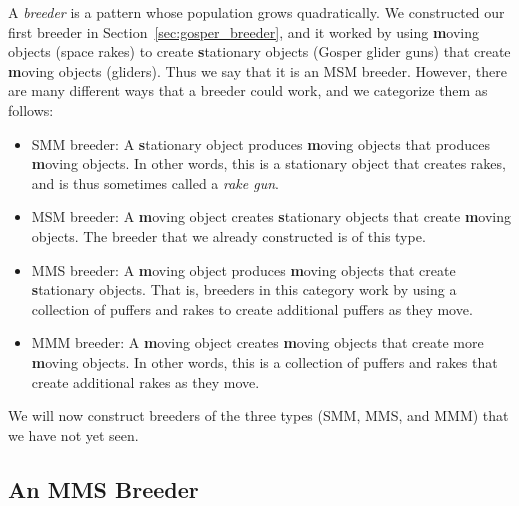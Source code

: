 A \emph{breeder} is a pattern whose population grows quadratically. We constructed our first breeder in Section~\ref{sec:gosper_breeder}, and it worked by using \textbf{m}oving objects (space rakes) to create \textbf{s}tationary objects (Gosper glider guns) that create \textbf{m}oving objects (gliders). Thus we say that it is an MSM breeder. However, there are many different ways that a breeder could work, and we categorize them as follows:
\begin{itemize}
	\item SMM breeder: A \textbf{s}tationary object produces \textbf{m}oving objects that produces \textbf{m}oving objects. In other words, this is a stationary object that creates rakes, and is thus sometimes called a \emph{rake gun}.
	\item MSM breeder: A \textbf{m}oving object creates \textbf{s}tationary objects that create \textbf{m}oving objects. The breeder that we already constructed is of this type.
	\item MMS breeder: A \textbf{m}oving object produces \textbf{m}oving objects that create \textbf{s}tationary objects. That is, breeders in this category work by using a collection of puffers and rakes to create additional puffers as they move.
	\item MMM breeder: A \textbf{m}oving object creates \textbf{m}oving objects that create more \textbf{m}oving objects. In other words, this is a collection of puffers and rakes that create additional rakes as they move.
\end{itemize}

We will now construct breeders of the three types (SMM, MMS, and MMM) that we have not yet seen.


\subsection{An MMS Breeder}\label{sec:mms_breeder}

